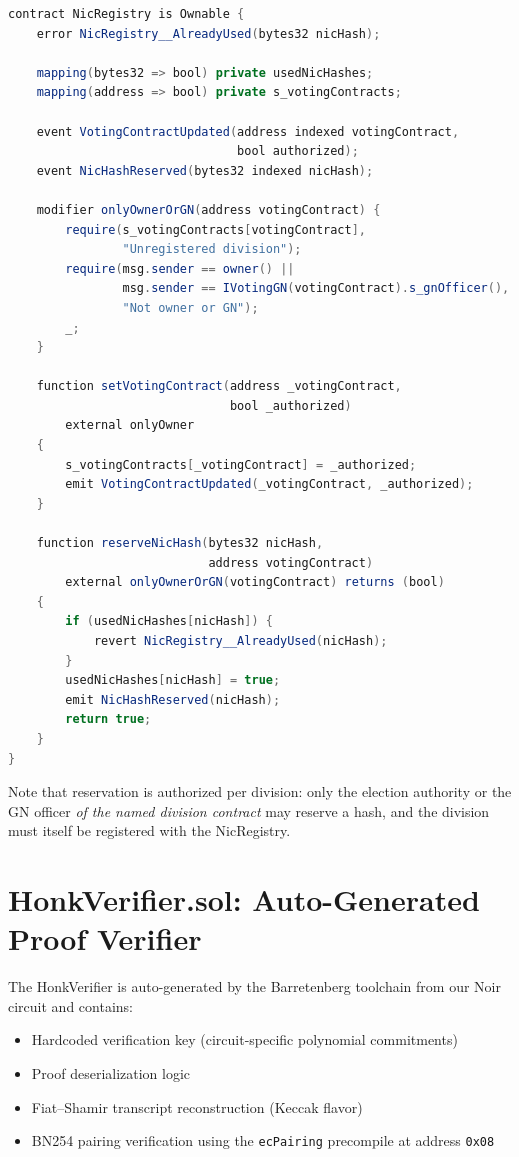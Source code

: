 \begin{lstlisting}[language=Java, caption={NicRegistry contract for cross-division Sybil prevention.}]
contract NicRegistry is Ownable {
    error NicRegistry__AlreadyUsed(bytes32 nicHash);

    mapping(bytes32 => bool) private usedNicHashes;
    mapping(address => bool) private s_votingContracts;

    event VotingContractUpdated(address indexed votingContract,
                                bool authorized);
    event NicHashReserved(bytes32 indexed nicHash);

    modifier onlyOwnerOrGN(address votingContract) {
        require(s_votingContracts[votingContract],
                "Unregistered division");
        require(msg.sender == owner() ||
                msg.sender == IVotingGN(votingContract).s_gnOfficer(),
                "Not owner or GN");
        _;
    }

    function setVotingContract(address _votingContract,
                               bool _authorized)
        external onlyOwner
    {
        s_votingContracts[_votingContract] = _authorized;
        emit VotingContractUpdated(_votingContract, _authorized);
    }

    function reserveNicHash(bytes32 nicHash,
                            address votingContract)
        external onlyOwnerOrGN(votingContract) returns (bool)
    {
        if (usedNicHashes[nicHash]) {
            revert NicRegistry__AlreadyUsed(nicHash);
        }
        usedNicHashes[nicHash] = true;
        emit NicHashReserved(nicHash);
        return true;
    }
}
\end{lstlisting}

Note that reservation is authorized per division: only the election authority or the GN officer \emph{of the named division contract} may reserve a hash, and the division must itself be registered with the NicRegistry.

\section{HonkVerifier.sol: Auto-Generated Proof Verifier}

The HonkVerifier is auto-generated by the Barretenberg toolchain from our Noir circuit and contains:
\begin{itemize}
    \item Hardcoded verification key (circuit-specific polynomial commitments)
    \item Proof deserialization logic
    \item Fiat--Shamir transcript reconstruction (Keccak flavor)
    \item BN254 pairing verification using the \texttt{ecPairing} precompile at address \texttt{0x08}
\end{itemize}

